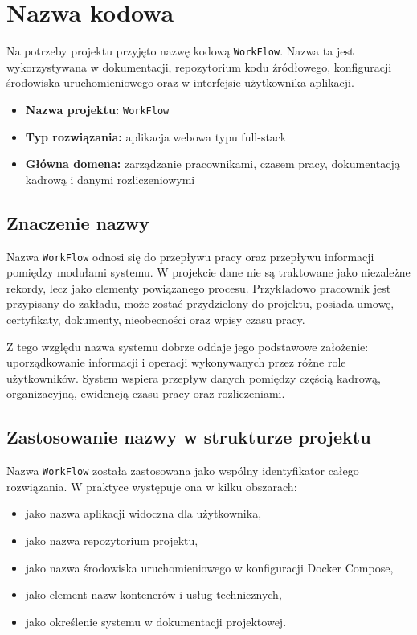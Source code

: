 \section{Nazwa kodowa}

Na potrzeby projektu przyjęto nazwę kodową \texttt{WorkFlow}. Nazwa ta jest wykorzystywana w dokumentacji, repozytorium kodu źródłowego, konfiguracji środowiska uruchomieniowego oraz w interfejsie użytkownika aplikacji.

\begin{itemize}
    \item \textbf{Nazwa projektu:} \texttt{WorkFlow}
    \item \textbf{Typ rozwiązania:} aplikacja webowa typu full-stack
    \item \textbf{Główna domena:} zarządzanie pracownikami, czasem pracy, dokumentacją kadrową i danymi rozliczeniowymi
\end{itemize}

\subsection{Znaczenie nazwy}

Nazwa \texttt{WorkFlow} odnosi się do przepływu pracy oraz przepływu informacji pomiędzy modułami systemu. W projekcie dane nie są traktowane jako niezależne rekordy, lecz jako elementy powiązanego procesu. Przykładowo pracownik jest przypisany do zakładu, może zostać przydzielony do projektu, posiada umowę, certyfikaty, dokumenty, nieobecności oraz wpisy czasu pracy.

Z tego względu nazwa systemu dobrze oddaje jego podstawowe założenie: uporządkowanie informacji i operacji wykonywanych przez różne role użytkowników. System wspiera przepływ danych pomiędzy częścią kadrową, organizacyjną, ewidencją czasu pracy oraz rozliczeniami.

\subsection{Zastosowanie nazwy w strukturze projektu}

Nazwa \texttt{WorkFlow} została zastosowana jako wspólny identyfikator całego rozwiązania. W praktyce występuje ona w kilku obszarach:
\begin{itemize}
    \item jako nazwa aplikacji widoczna dla użytkownika,
    \item jako nazwa repozytorium projektu,
    \item jako nazwa środowiska uruchomieniowego w konfiguracji Docker Compose,
    \item jako element nazw kontenerów i usług technicznych,
    \item jako określenie systemu w dokumentacji projektowej.
\end{itemize}

